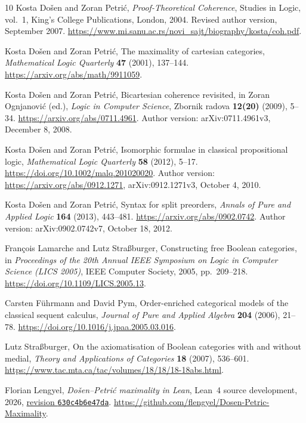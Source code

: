 \documentclass[11pt]{article}
\begin{document}
\clearpage
\begin{thebibliography}{10}
\small
\setlength{\itemsep}{2pt}
\setlength{\parskip}{0pt}
Kosta Do\v{s}en and Zoran Petri\'c,
\emph{Proof-Theoretical Coherence},
Studies in Logic, vol.~1, King's College Publications, London, 2004.
Revised author version, September 2007.
\url{https://www.mi.sanu.ac.rs/novi_sajt/biography/kosta/coh.pdf}.

Kosta Do\v{s}en and Zoran Petri\'c,
The maximality of cartesian categories,
\emph{Mathematical Logic Quarterly} \textbf{47} (2001), 137--144.
\url{https://arxiv.org/abs/math/9911059}.

Kosta Do\v{s}en and Zoran Petri\'c,
Bicartesian coherence revisited,
in Zoran Ognjanovi\'c (ed.), \emph{Logic in Computer Science},
Zbornik radova \textbf{12(20)} (2009), 5--34.
\url{https://arxiv.org/abs/0711.4961}.
Author version: arXiv:0711.4961v3, December 8, 2008.

Kosta Do\v{s}en and Zoran Petri\'c,
Isomorphic formulae in classical propositional logic,
\emph{Mathematical Logic Quarterly} \textbf{58} (2012), 5--17.
\url{https://doi.org/10.1002/malq.201020020}.
Author version: \url{https://arxiv.org/abs/0912.1271},
arXiv:0912.1271v3, October 4, 2010.

Kosta Do\v{s}en and Zoran Petri\'c,
Syntax for split preorders,
\emph{Annals of Pure and Applied Logic} \textbf{164} (2013), 443--481.
\url{https://arxiv.org/abs/0902.0742}.
Author version: arXiv:0902.0742v7, October 18, 2012.

Fran\c{c}ois Lamarche and Lutz Stra{\ss}burger,
Constructing free Boolean categories,
in \emph{Proceedings of the 20th Annual IEEE Symposium on Logic in
Computer Science (LICS 2005)}, IEEE Computer Society, 2005, pp.~209--218.
\url{https://doi.org/10.1109/LICS.2005.13}.

Carsten F\"uhrmann and David Pym,
Order-enriched categorical models of the classical sequent calculus,
\emph{Journal of Pure and Applied Algebra} \textbf{204} (2006), 21--78.
\url{https://doi.org/10.1016/j.jpaa.2005.03.016}.

Lutz Stra{\ss}burger,
On the axiomatisation of Boolean categories with and without medial,
\emph{Theory and Applications of Categories} \textbf{18} (2007),
536--601.
\url{https://www.tac.mta.ca/tac/volumes/18/18/18-18abs.html}.

Florian Lengyel,
\emph{Do\v{s}en--Petri\'c maximality in Lean},
Lean~4 source development, 2026,
\href{https://github.com/flengyel/Dosen-Petric-Maximality/tree/630c4b6e47da16a1434476a211fd29ce6adc5569}{revision \texttt{630c4b6e47da}}.
\url{https://github.com/flengyel/Dosen-Petric-Maximality}.


\end{thebibliography}
\end{document}
